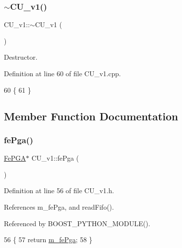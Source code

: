 \subsubsection{\texorpdfstring{$\sim$\+C\+U\+\_\+v1()}{~CU\_v1()}}
{\footnotesize\ttfamily C\+U\+\_\+v1\+::$\sim$\+C\+U\+\_\+v1 (\begin{DoxyParamCaption}{ }\end{DoxyParamCaption})\hspace{0.3cm}{\ttfamily [virtual]}}



Destructor. 



Definition at line 60 of file C\+U\+\_\+v1.\+cpp.


\begin{DoxyCode}
60               \{
61 \}
\end{DoxyCode}


\subsection{Member Function Documentation}
\mbox{\label{classCU__v1_a6bdee7e086b6c0b2acee0879aee137ed}} 
\subsubsection{\texorpdfstring{fe\+Pga()}{fePga()}}
{\footnotesize\ttfamily \hyperlink{classFePGA}{Fe\+P\+GA}$\ast$ C\+U\+\_\+v1\+::fe\+Pga (\begin{DoxyParamCaption}{ }\end{DoxyParamCaption})\hspace{0.3cm}{\ttfamily [inline]}}



Definition at line 56 of file C\+U\+\_\+v1.\+h.



References m\+\_\+fe\+Pga, and read\+Fifo().



Referenced by B\+O\+O\+S\+T\+\_\+\+P\+Y\+T\+H\+O\+N\+\_\+\+M\+O\+D\+U\+L\+E().


\begin{DoxyCode}
56                 \{
57     \textcolor{keywordflow}{return} \hyperlink{classCU__v1_a1b96b95e89dbe383877b34f9b517d910}{m\_fePga};
58   \}
\end{DoxyCode}
\mbox{\label{classCU__v1_af4033fc5da7bff845565d7e6ea1802ce}} 
